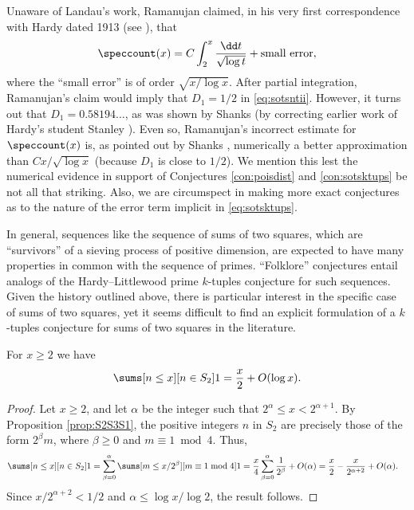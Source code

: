 \documentclass[12pt, reqno, twoside, letterpaper]{amsart}
\begin{document}
\begin{jetsam}
Unaware of Landau's work, Ramanujan claimed, in his very first   
correspondence with Hardy dated 1913 
(see \cite[pp.\ xxiv--xxviii]{RAM:00}), that 
\[
 \speccount(x)
  = 
   C\int_2^x \frac{\dd t}{\sqrt{\log t}} + \text{small error}, 
\]
where the ``small error'' is of order $\sqrt{x/\log x}$.
%
After partial integration, Ramanujan's claim would imply that 
$D_1 = 1/2$ in \eqref{eq:sotsntii}.
%
However, it turns out that $D_1 = 0.58194\ldots$, as was 
shown by Shanks \cite{SHA:64} (by correcting earlier work of  
Hardy's student Stanley \cite{STA:28}).
%
Even so, Ramanujan's incorrect estimate for $\speccount(x)$ is, as 
pointed out by Shanks \cite{SHA:64}, numerically a better 
approximation than $Cx/\sqrt{\log x}$ (because $D_1$ is close to 
$1/2$). 
%
We mention this lest the numerical evidence in support of 
Conjectures \ref{con:poisdist} and \ref{con:sotsktups} be not all 
that striking.
%
Also, we are circumspect in making more exact conjectures as to the 
nature of the error term implicit in \eqref{eq:sotsktups}.

In general, sequences like the sequence of sums of two squares, 
which are ``survivors'' of a sieving process of positive 
dimension, are expected to have many properties in common with the 
sequence of primes.
%
``Folklore'' conjectures entail analogs of the Hardy--Littlewood 
prime $k$-tuples conjecture for such sequences. 
%
Given the history outlined above, there is particular interest in 
the specific case of sums of two squares, yet it seems difficult 
to find an explicit formulation of a $k$-tuples conjecture for 
sums of two squares in the literature.


\begin{proposition}
 \label{prop:S2est}
For $x \ge 2$ we have 
\[
  \sums[n \le x][n \in S_2] 1 = \frac{x}{2} + O(\log x).
\]
\end{proposition}

\begin{proof}
Let $x \ge 2$, and let $\alpha$ be the integer such that 
$2^{\alpha} \le x < 2^{\alpha + 1}$.
%
By Proposition \ref{prop:S2S3S1}, the positive integers $n$ in 
$S_2$ are precisely those of the form $2^{\beta}m$, where 
$\beta \ge 0$ and $m \equiv 1 \bmod 4$.
%
Thus, 
\begin{align*}
  \sums[n \le x][n \in S_2] 1
  & = 
   \sum_{\beta = 0}^{\alpha}
    \sums[m \le x/2^{\beta}][m \equiv 1 \bmod 4] 1
     =
      \frac{x}{4}\sum_{\beta = 0}^{\alpha} \frac{1}{2^{\beta}}
       + O(\alpha)
     =
      \frac{x}{2} - \frac{x}{2^{\alpha + 2}} + O(\alpha).
\end{align*}
%
Since $x/2^{\alpha + 2} < 1/2$ and $\alpha \le \log x/\log 2$, the 
result follows.
\end{proof}


\end{jetsam}
\end{document}
